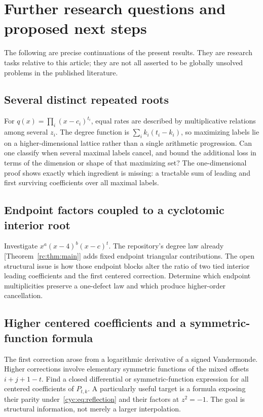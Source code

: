\documentclass[11pt,a4paper]{article}
\numberwithin{equation}{section}
\theoremstyle{definition}
\theoremstyle{remark}
\begin{document}
\section{Further research questions and proposed next steps}\label{cyc:sec:future}

The following are precise continuations of the present results.  They
are research tasks relative to this article; they are not all asserted
to be globally unsolved problems in the published literature.

\subsection{Several distinct repeated roots}
For $q(x)=\prod_i(x-c_i)^{t_i}$, equal rates are described by
multiplicative relations among several $z_i$.  The degree function is
$\sum_i k_i(t_i-k_i)$, so maximizing labels lie on a higher-dimensional
lattice rather than a single arithmetic progression.  Can one classify
when several maximal labels cancel, and bound the additional loss in
terms of the dimension or shape of that maximizing set?  The
one-dimensional proof shows exactly which ingredient is missing:
a tractable sum of leading and first surviving coefficients over all
maximal labels.

\subsection{Endpoint factors coupled to a cyclotomic interior root}\label{tec:x:cycendpoint}
Investigate $x^a(x-4)^b(x-c)^t$.  The repository's degree law already
[Theorem~\ref{rc:thm:main}] adds fixed endpoint triangular contributions.  The open structural
issue is how those endpoint blocks alter the ratio of two tied
interior leading coefficients and the first centered correction.
Determine which endpoint multiplicities preserve a one-defect law and
which produce higher-order cancellation.

\subsection{Higher centered coefficients and a symmetric-function formula}
The first correction arose from a logarithmic derivative of a signed
Vandermonde.  Higher corrections involve elementary symmetric
functions of the mixed offsets $i+j+1-t$.  Find a closed differential
or symmetric-function expression for all centered coefficients of
$P_{t,k}$.  A particularly useful target is a formula exposing their
parity under~\eqref{cyc:eq:reflection} and their factors at $z^2=-1$.
The goal is structural information, not merely a larger interpolation.
\end{document}
